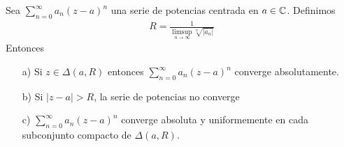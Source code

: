 \begin{teo}
    Sea $\sum_{n=0}^{\infty}{a_n(z-a)^n}$ una serie de potencias centrada en $a \in \mathbb{C}$. Definimos
    \begin{align*}
        R = \frac{1}{\limsup_{n \to \infty}{\sqrt[n]{|a_n|}}}
    \end{align*}
    Entonces
    \begin{enumerate}
        \item[a)] Si $z \in \Delta(a,R)$ entonces $\sum_{n=0}^{\infty}{a_n(z-a)^n}$ converge absolutamente.
        \item[b)] Si $|z-a| > R$, la serie de potencias no converge
        \item[c)] $\sum_{n=0}^{\infty}{a_n(z-a)^n}$ converge absoluta y uniformemente en cada subconjunto compacto de $\Delta(a,R)$.
    \end{enumerate}
\end{teo}

